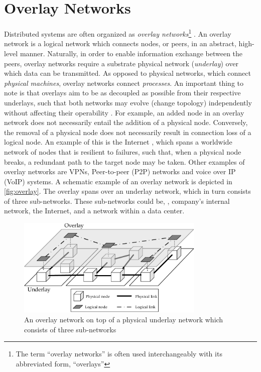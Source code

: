 \section{Overlay Networks} \label{sec:overlays}
Distributed systems are often organized as \emph{overlay networks}\footnote{The term ``overlay networks'' is often used interchangeably with its abbreviated form, ``overlays''} \cite{tarkoma2010overlay}. An overlay network is a logical network which connects nodes, or peers, in an abstract, high-level manner. Naturally, in order to enable information exchange between the peers, overlay networks require a substrate physical network (\emph{underlay}) over which data can be transmitted. As opposed to physical networks, which connect \emph{physical machines}, overlay networks connect \emph{processes}. An important thing to note is that overlays aim to be as decoupled as possible from their respective underlays, such that both networks may evolve (change topology) independently without affecting their operability \cite{tanenbaum2017distributed}. For example, an added node in an overlay network does not necessarily entail the addition of a physical node. Conversely, the removal of a physical node does not necessarily result in connection loss of a logical node. An example of this is the Internet \cite{vaezi2017virtualization}, which spans a worldwide network of nodes that is resilient to failures, such that, when a physical node breaks, a redundant path to the target node may be taken. Other examples of overlay networks are VPNs, Peer-to-peer (P2P) networks and voice over IP (VoIP) systems. A schematic example of an overlay network is depicted in \autoref{fig:overlay}. The overlay spans over an underlay network, which in turn consists of three sub-networks. These sub-networks could be, \eg , company's internal network, the Internet, and a network within a data center. 

\begin{figure}[htpb]
  \centering
  \includegraphics[width=0.8\textwidth]{figures/overlay.pdf}
  \caption[Overlay networking concept]{An overlay network on top of a physical underlay network which consists of three sub-networks}\label{fig:overlay}
\end{figure}

